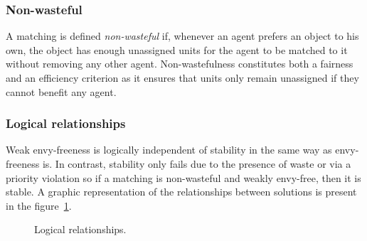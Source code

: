 \subsubsection{Non-wasteful}%

A matching is defined \textit{non-wasteful} if, whenever an agent prefers an object to his own, the object has enough unassigned units for the agent to be matched to it without removing any other agent. Non-wastefulness constitutes both a fairness and an efficiency criterion as it ensures that units only remain unassigned if they cannot benefit any agent.


\subsubsection{Logical relationships}%

Weak envy-freeness is logically independent of stability in the same way as envy-freeness is. In contrast, stability only fails due to the presence of waste or via a priority violation so if a matching is non-wasteful and weakly envy-free, then it is stable. A graphic representation of the relationships between solutions is present in the figure~\ref{fig:matching}.

\begin{figure}[!htb]
    \def\svgwidth{\columnwidth}
    
    \caption{Logical relationships.}
    \label{fig:matching}
\end{figure}
